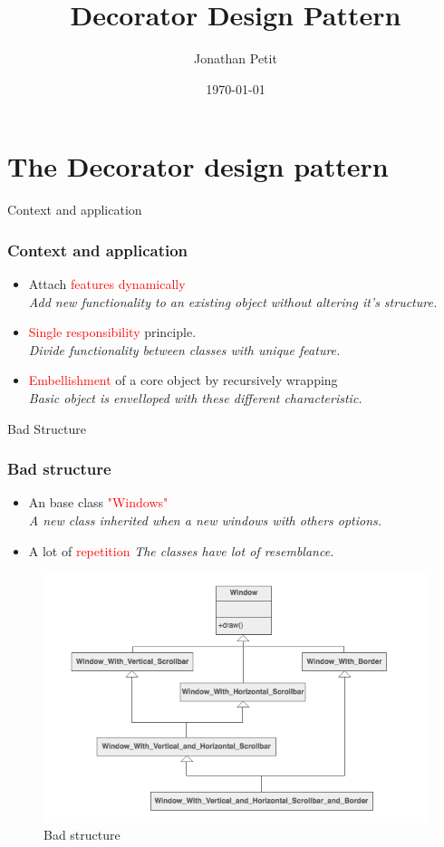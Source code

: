 \documentclass{beamer}
\title{Decorator Design Pattern}
\date{\today}
\author{Jonathan Petit}
\institute{ECAM}
\begin{document}
  \maketitle

\section{The Decorator design pattern}

  \begin{frame}{Context and application}
    \frametitle{Context and application}
    \begin{itemize}
      \item Attach \textcolor{red}{features dynamically} \\
      \textit{Add new functionality to an existing object without altering it's structure.}
      \item \textcolor{red}{Single responsibility} principle. \\
      \textit{Divide functionality between classes with unique feature.}
      \item \textcolor{red}{Embellishment} of a core object by recursively wrapping \\
      \textit{Basic object is envelloped with these different characteristic.}
    \end{itemize}
  \end{frame}

  \begin{frame}{Bad Structure}
    \frametitle{Bad structure}
    \begin{itemize}
      \item An base class \textcolor{red}{"Windows"} \\
      \textit{A new class inherited when a new windows with others options.}
      \item A lot of \textcolor{red}{repetition}
      \textit{The classes have lot of resemblance.}
    \end{itemize}
    \begin{figure}[!b]
      \centering
      \includegraphics[scale=0.3]{bad}
      \caption{Bad structure}
    \end{figure}
  \end{frame}
\end{document}

